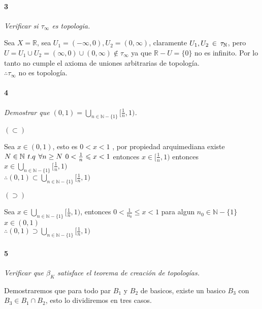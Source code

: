 \documentclass[12pt]{article}
\begin{document}
\paragraph{3}
\textit{Verificar si $\tau_{\infty}$ es topologia.} 

Sea $X=\mathbb{R}$, sea $U_1 = (-\infty,0),U_2 = (0,\infty)$, claramente $U_1,U_{2}\hspace{2px}\in\hspace{2px}\tau_{\mathbb{N}}$, pero $U=U_1\cup U_2 = (\infty,0)\cup(0,\infty)\notin \tau_{\infty}$
ya que $\mathbb{R}-U=\{0\}$ no es infinito. Por lo tanto no cumple el axioma de uniones arbitrarias de topología.\\ $\therefore\tau_{\infty}$ no es topología.\\

\paragraph{4}
\textit{Demostrar que $(0,1)=\bigcup\limits_{n\in\mathbb{N}-\{1\}}[\frac{1}{n},1)$.}

$(\subset)$

Sea $x\in(0,1)$, esto es $0<x<1$ , por propiedad arquimediana existe $ N \in\mathbb{N}\hspace{4px}t.q \hspace{4px} \forall n\geq N \hspace{4px} 0< \frac{1}{n} \leqslant  x<1$ entonces $x\in[\frac{1}{n},1)$
entonces $x\in\bigcup\limits_{n\in\mathbb{N}-\{1\}}[\frac{1}{n},1)$\\$\therefore(0,1)\subset\bigcup\limits_{n\in\mathbb{N}-\{1\}}[\frac{1}{n},1)$

$(\supset)$

Sea $x\in\bigcup\limits_{n\in\mathbb{N}-\{1\}}[\frac{1}{n},1)$, entonces $0<\frac{1}{n_0}\leq x<1$ para algun $n_0\in\mathbb{N}-\{1\}$\\$x\in(0,1)$\\$\therefore(0,1)\supset\bigcup\limits_{n\in\mathbb{N}-\{1\}}[\frac{1}{n},1)$

\paragraph{5}
\textit{Verificar que $\beta_K$ satisface el teorema de creación de topologías.}

Demostraremos que para todo par $B_1$ y $B_2$ de basicos, existe un basico $B_3$ con $B_3\in B_1 \cap B_2$, esto lo dividiremos en tres casos.
\vspace{0.15cm}
\end{document}
